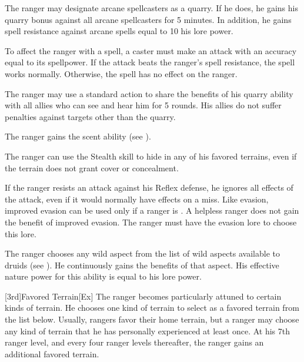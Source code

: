 The ranger may designate arcane spellcasters as a quarry.
If he does, he gains his quarry bonus against all arcane spellcasters for 5 minutes.
In addition, he gains spell resistance against arcane spells equal to 10 \add his lore power.

To affect the ranger with a spell, a caster must make an attack with an accuracy equal to its spellpower.
If the attack beats the ranger's spell resistance, the spell works normally.
Otherwise, the spell has no effect on the ranger.

The ranger may use a standard action to share the benefits of his quarry ability with all allies who can see and hear him for 5 rounds.
His allies do not suffer penalties against targets other than the quarry.

The ranger gains the scent ability (see ).

\label{Camouflage}
The ranger can use the Stealth skill to hide in any of his favored terrains, even if the terrain does not grant cover or concealment.

If the ranger resists an attack against his Reflex defense, he ignores all effects of the attack, even if it would normally have effects on a miss.
Like evasion, improved evasion can be used only if a ranger is \unencumbered.
A helpless ranger does not gain the benefit of improved evasion.
The ranger must have the evasion lore to choose this lore.

The ranger chooses any wild aspect from the list of wild aspects available to druids (see ).
He continuously gains the benefits of that aspect.
His effective nature power for this ability is equal to his lore power.

[3rd]{Favored Terrain}[Ex]
The ranger becomes particularly attuned to certain kinds of terrain.
He chooses one kind of terrain to select as a favored terrain from the list below.
Usually, rangers favor their home terrain, but a ranger may choose any kind of terrain that he has personally experienced at least once.
At his 7th ranger level, and every four ranger levels thereafter, the ranger gains an additional favored terrain.


